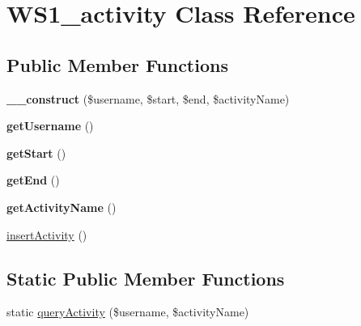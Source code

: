 \hypertarget{class_w_s1__activity}{\section{W\+S1\+\_\+activity Class Reference}
\label{class_w_s1__activity}
}
\subsection*{Public Member Functions}
\begin{DoxyCompactItemize}
\item 
\hypertarget{class_w_s1__activity_a142106110874672839c09210568f5f78}{{\bfseries \+\_\+\+\_\+construct} (\$username, \$start, \$end, \$activity\+Name)}\label{class_w_s1__activity_a142106110874672839c09210568f5f78}

\item 
\hypertarget{class_w_s1__activity_a81b37a3c9d639574e394f80c1138c75e}{{\bfseries get\+Username} ()}\label{class_w_s1__activity_a81b37a3c9d639574e394f80c1138c75e}

\item 
\hypertarget{class_w_s1__activity_aa86e59bfce83f0dbfcd14a0c2a83e98e}{{\bfseries get\+Start} ()}\label{class_w_s1__activity_aa86e59bfce83f0dbfcd14a0c2a83e98e}

\item 
\hypertarget{class_w_s1__activity_a000b799500c1a9b8f1bd60c204191563}{{\bfseries get\+End} ()}\label{class_w_s1__activity_a000b799500c1a9b8f1bd60c204191563}

\item 
\hypertarget{class_w_s1__activity_a9b566deb2ebd8bd785e67239540901f0}{{\bfseries get\+Activity\+Name} ()}\label{class_w_s1__activity_a9b566deb2ebd8bd785e67239540901f0}

\item 
\hyperlink{class_w_s1__activity_ad3e801b624751fc2a3f596f04f81dcaf}{insert\+Activity} ()
\end{DoxyCompactItemize}
\subsection*{Static Public Member Functions}
\begin{DoxyCompactItemize}
\item 
static \hyperlink{class_w_s1__activity_aa8ded292bcca041d208f8cee7a41e6cb}{query\+Activity} (\$username, \$activity\+Name)
\end{DoxyCompactItemize}


